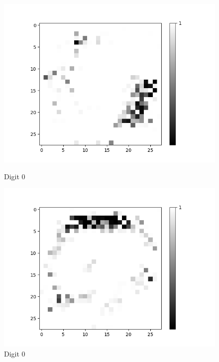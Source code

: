 \begin{figure}[H]
	\captionsetup{labelformat=empty}
	\centering
	\begin{minipage}[b]{0.19\textwidth}
		\includegraphics[width=\textwidth]{OR-AND(1)/Like/True/Layer0-Neuron-18.png}
		\caption{Digit 0}
		\label{fig:cnf-descrete-generalizatiion}
	\end{minipage}
	\begin{minipage}[b]{0.19\textwidth}
		\includegraphics[width=\textwidth]{OR-AND(1)/Like/True/Layer0-Neuron-19.png}
		\caption{Digit 0}
		\label{fig:cnf-descrete-generalizatiion}
	\end{minipage}
	\begin{minipage}[b]{0.19\textwidth}

\end{minipage}
\end{figure}

